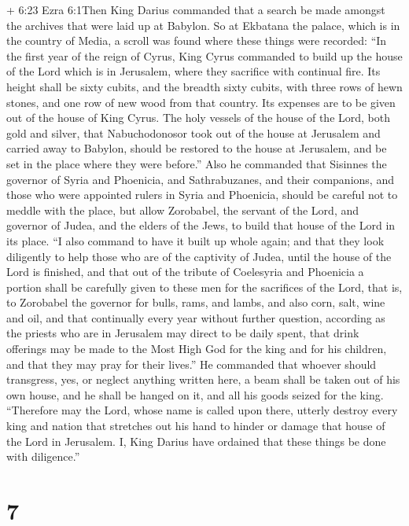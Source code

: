  + 6:23 Ezra 6:1Then King Darius commanded that a search be
made amongst the archives that were laid up at Babylon. So at Ekbatana
the palace, which is in the country of Media, a scroll was found where
these things were recorded:  ``In the first year of the
reign of Cyrus, King Cyrus commanded to build up the house of the Lord
which is in Jerusalem, where they sacrifice with continual fire.
 Its height shall be sixty cubits, and the breadth sixty
cubits, with three rows of hewn stones, and one row of new wood from
that country. Its expenses are to be given out of the house of King
Cyrus.  The holy vessels of the house of the Lord, both
gold and silver, that Nabuchodonosor took out of the house at Jerusalem
and carried away to Babylon, should be restored to the house at
Jerusalem, and be set in the place where they were before.''
 Also he commanded that Sisinnes the governor of Syria and
Phoenicia, and Sathrabuzanes, and their companions, and those who were
appointed rulers in Syria and Phoenicia, should be careful not to meddle
with the place, but allow Zorobabel, the servant of the Lord, and
governor of Judea, and the elders of the Jews, to build that house of
the Lord in its place.  ``I also command to have it built
up whole again; and that they look diligently to help those who are of
the captivity of Judea, until the house of the Lord is finished,
 and that out of the tribute of Coelesyria and Phoenicia a
portion shall be carefully given to these men for the sacrifices of the
Lord, that is, to Zorobabel the governor for bulls, rams, and lambs,
 and also corn, salt, wine and oil, and that continually
every year without further question, according as the priests who are in
Jerusalem may direct to be daily spent,  that drink
offerings may be made to the Most High God for the king and for his
children, and that they may pray for their lives.''  He
commanded that whoever should transgress, yes, or neglect anything
written here, a beam shall be taken out of his own house, and he shall
be hanged on it, and all his goods seized for the king. 
``Therefore may the Lord, whose name is called upon there, utterly
destroy every king and nation that stretches out his hand to hinder or
damage that house of the Lord in Jerusalem.  I, King Darius
have ordained that these things be done with diligence.''

\hypertarget{section-6}{%
\section{7}\label{section-6}}

